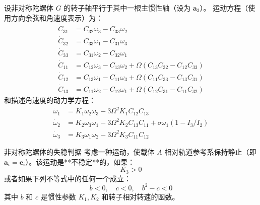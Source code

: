 设非对称陀螺体 \(G\) 的转子轴平行于其中一根主惯性轴（设为 \(\mathbf{a}_3\)）。
运动方程（使用方向余弦和角速度表示）为：
\begin{align}
\dot{C}_{31} &= C_{32}\omega_3 - C_{33}\omega_2 \tag{4} \\
\dot{C}_{32} &= C_{33}\omega_1 - C_{31}\omega_3 \tag{5} \\
\dot{C}_{33} &= C_{31}\omega_2 - C_{32}\omega_1 \tag{6} \\
\dot{C}_{11} &= C_{12}\omega_3 - C_{13}\omega_2 + \Omega(C_{13}C_{32} - C_{12}C_{33}) \tag{7} \\
\dot{C}_{12} &= C_{13}\omega_1 - C_{11}\omega_3 + \Omega(C_{11}C_{33} - C_{13}C_{31}) \tag{8} \\
\dot{C}_{13} &= C_{11}\omega_2 - C_{12}\omega_1 + \Omega(C_{12}C_{31} - C_{11}C_{32}) \tag{9}
\end{align}
和描述角速度的动力学方程：
\begin{align}
\dot{\omega}_1 &= K_1\omega_2\omega_3 - 3\Omega^2 K_1 C_{12}C_{13} \tag{10} \\
\dot{\omega}_2 &= K_2\omega_3\omega_1 - 3\Omega^2 K_2 C_{13}C_{11} + \sigma\omega_1(1 - I_3/I_2) \tag{11} \\
\dot{\omega}_3 &= K_3\omega_1\omega_2 - 3\Omega^2 K_3 C_{11}C_{12} \tag{12}
\end{align}
\begin{myTheorem}{非对称陀螺体的失稳判据}
考虑一种运动，使载体 \(A\) 相对轨道参考系保持静止（即 \(\mathbf{a}_i = \mathbf{e}_i\)）。该运动是**不稳定**的，如果：
\begin{equation}
K_3 > 0 \tag{18}
\end{equation}
或者如果下列不等式中的任何一个成立：
\begin{equation}
b < 0, \quad c < 0, \quad b^2 - c < 0 \tag{19}
\end{equation}
其中 \(b\) 和 \(c\) 是惯性参数 \(K_1, K_2\) 和转子相对转速的函数。
\end{myTheorem}